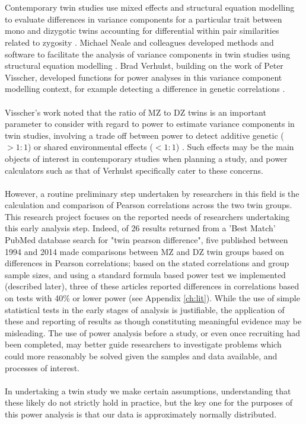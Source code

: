 \\
\\
Contemporary twin studies use mixed effects and structural equation modelling to evaluate differences in variance components for a particular trait between mono and dizygotic twins accounting for differential within pair similarities related to zygosity \cite{Neale1992,Carlin2005}.  Michael Neale and colleagues developed methods and software to facilitate the analysis of variance components in twin studies using structural equation modelling \cite{Neale1992}.  Brad Verhulst, building on the work of Peter Visscher, developed functions for power analyses in this variance component modelling context, for example detecting a difference in genetic correlations \cite{Verhulst2017,Visscher2004,Visscher2008a}. 
\\
\\
Visscher's work noted that the ratio of MZ to DZ twins is an important parameter to consider with regard to power to estimate variance components in twin studies, involving a trade off between power to detect additive genetic ($>1:1$) or shared environmental effects ($<1:1$) \cite{Visscher2008a}.  Such effects may be the main objects of interest in contemporary studies when planning a study, and power calculators such as that of Verhulst \cite{Verhulst2017} specifically cater to these concerns.  
\\
\\
However, a routine preliminary step undertaken by researchers in this field is the calculation and comparison of Pearson correlations across the two twin groups.  This research project focuses on the reported needs of researchers undertaking this early analysis step.  Indeed, of 26 results returned from a 'Best Match' PubMed database search for "twin pearson difference", five published between 1994 and 2014 made comparisons between MZ and DZ twin groups based on differences in Pearson correlations; based on the stated correlations and group sample sizes, and using a standard formula based power test we implemented (described later), three of these articles reported differences in correlations based on tests with 40\% or lower power (see Appendix \ref{ch:lit}).  While the use of simple statistical tests in the early stages of analysis is justifiable, the application of these and reporting of results as though constituting meaningful evidence may be misleading.  The use of power analysis before a study, or even once recruiting had been completed, may better guide researchers to investigate problems which could more reasonably be solved given the samples and data available, and processes of interest.
\\
\\
In undertaking a twin study we make certain assumptions, understanding that these likely do not strictly hold in practice, but the key one for the purposes of this power analysis is that our data is approximately normally distributed.

